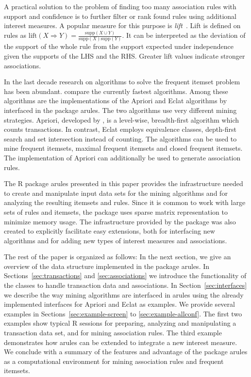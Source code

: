 \documentclass[10pt,a4paper]{article}
\newcommand{\strong}[1]{{\normalfont\fontseries{b}\selectfont #1}}
\newcommand{\pkg}[1]{\strong{#1}}
\newcommand{\proglang}[1]{\textsf{#1}}
\begin{document}
A practical solution to the problem of finding too many 
association rules with support and confidence is
to further filter or rank found rules using additional interest measures.
A popular measure for this purpose is 
\emph{lift}~\citep{arules:Brin+Motwani+Ullman+Tsur:1997}.
Lift is defined on rules as $\mathrm{lift}(X \Rightarrow Y) = 
\frac{\mathrm{supp}(X \cup Y)}{ \mathrm{supp}(X) \mathrm{supp}(Y)}$.
It can be interpreted as the deviation of the support of the whole 
rule from the support expected under independence given the 
supports of the LHS and the RHS.
Greater lift values indicate stronger associations.


In the last decade research on algorithms to solve the frequent itemset
problem has been abundant.  \cite{arules:Goethals+Zaki:2004} compare the
currently fastest algorithms.  Among these algorithms are the
implementations of the Apriori and Eclat algorithms by
\cite{arules:Borgelt:2003} interfaced in the package \pkg{arules}.
The two algorithms use very different mining strategies.  Apriori,
developed by \cite{arules:Agrawal+Srikant:1994}, is a level-wise,
breadth-first algorithm which counts transactions.  In contrast, Eclat
\citep{arules:Zaki+Parthasarathy+Ogihara+Li:1997} employs equivalence
classes, depth-first search and set intersection instead of counting.
The algorithms can be used to mine frequent itemsets, maximal frequent
itemsets and closed frequent itemsets.  The implementation of Apriori
can additionally be used to generate association rules.

The \proglang{R} package \pkg{arules} presented in this paper provides
the infrastructure needed to create and manipulate input data sets for
the mining algorithms and for analyzing the resulting itemsets and
rules.  Since it is common to work with large sets of rules and
itemsets, the package uses sparse matrix representation to minimize
memory usage.  The infrastructure provided by the package was also
created to explicitly facilitate easy extensions, both for interfacing
new algorithms and for adding new types of interest measures and
associations.

The rest of the paper is organized as follows: In the next section, we
give an overview of the data structure implemented in the package
\pkg{arules}.  In Sections~\ref{sec:transactions} and
\ref{sec:associations} we introduce the functionality of the classes to
handle transaction data and associations.  In
Section~\ref{sec:interfaces} we describe the way mining algorithms are
interfaced in \pkg{arules} using the already implemented interfaces for
Apriori and Eclat as examples.  We provide several examples in
Sections~\ref{sec:example-screen} to \ref{sec:example-allconf}.  The
first two examples show typical \proglang{R} sessions for preparing, 
analyzing and
manipulating a transaction data set, and for mining association rules.
The third example demonstrates how \pkg{arules} can be extended to
integrate a new interest measure.  We conclude with a summary of the
features and advantage of the package \pkg{arules} as a computational
environment for mining association rules and frequent itemsets.
\end{document}
